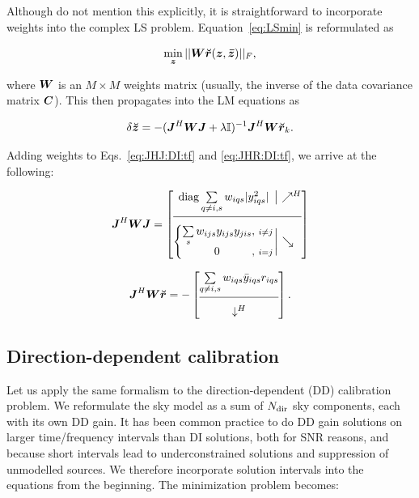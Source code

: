 \documentclass[useAMS,usenatbib]{mn2e}
\newcommand{\II}{\mathbb{I}}
\newcommand{\mat}[1]{{\bmath{#1}}}
\newcommand{\JJ}{\mat{J}} %
\begin{document}
Although \citet{ComplexOpt} do not mention this explicitly, it is straightforward to incorporate weights into the 
complex LS problem. Equation~\ref{eq:LSmin} is reformulated as

\begin{equation}
\label{eq:LSmin:w}
\min_{\bmath{z}} ||\mat{W} \Rr(\bmath{z},\bmath{\bar z})||_F,
\end{equation}

where $\mat{W}$ is an $M\times M$ weights matrix (usually, the inverse of the data covariance matrix $\mat{C}$). This then propagates into the LM equations as

\begin{equation}
\label{eq:LM:W}
\delta\Zz = -(\JJ^H \mat{W} \JJ + \lambda\II)^{-1}\JJ^H \mat{W} \Rr_k.
\end{equation}

Adding weights to Eqs.~\ref{eq:JHJ:DI:tf} and \ref{eq:JHR:DI:tf}, we arrive at the following:


\begin{equation}
\label{eq:JHJ:DI:tfw}
\JJ^H\mat{W}\JJ = 
\JHJblocks{
  \mathrm{diag} \sum\limits_{q\ne i,s} w_{iqs} |y^2_{iqs}|
}{
  \left \{ 
  \begin{array}{@{}c@{,~}c@{}}
   \sum\limits_{s} w_{ijs} y_{ijs}y_{jis}&{\scriptstyle i\ne j} \\
   0 &{\scriptstyle i=j}
  \end{array} \right . 
}
\end{equation}

\begin{equation}
\label{eq:JHR:DI:tfw}
\JJ^H\mat{W}\Rr 
= -\Matrix{c}{
\sum\limits_{q\ne i,s} w_{iqs} \bar{y}_{iqs} r_{iqs}   \\
\hline\\[-8pt]
\downarrow^H
}.
\end{equation}


\subsection{Direction-dependent calibration}
\label{sec:unpol:DD}

Let us apply the same formalism to the direction-dependent (DD) calibration problem. 
We reformulate the sky model as a sum of $N_\mathrm{dir}$ sky components, each with its own DD 
gain. It has been common practice to do DD gain solutions on larger time/frequency intervals than DI 
solutions, both for SNR reasons, and because short intervals lead to underconstrained solutions
and suppression of unmodelled sources. We therefore incorporate solution intervals into the
equations from the beginning. The minimization problem becomes:
\end{document}
